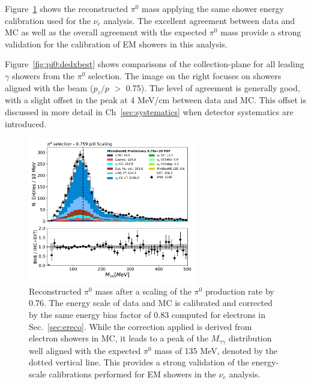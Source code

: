 Figure~\ref{fig:pi0massscaled} shows the reconstructed $\pi^0$ mass applying the same shower energy calibration used for the $\nu_e$ analysis. The excellent agreement between data and MC as well as the overall agreement with the expected $\pi^0$ mass provide a strong validation for the calibration of EM showers in this analysis.

Figure~\ref{fig:pi0:dedxbest} shows comparisons of the collection-plane \dedx for all leading $\gamma$ showers from the $\pi^0$ selection. The image on the right focuses on showers aligned with the beam ($p_z/p$ $>$ 0.75). The level of agreement is generally good, with a slight offset in the \dedx peak at 4 MeV/cm  between data and MC. This offset is discussed in more detail in Ch~\ref{sec:systematics} when detector systematics are introduced. 


\begin{figure}[H]
\begin{center}
\includegraphics[width=0.65\textwidth]{pi0/calorimetry/pi0_mass_Y_corr_run123.pdf}
\caption{\label{fig:pi0massscaled}Reconstructed $\pi^0$ mass after a scaling of the $\pi^0$ production rate by 0.76. The energy scale of data and MC is calibrated and corrected by the same energy bias factor of $0.83$ computed for electrons in Sec.~\ref{sec:ereco}. While the correction applied is derived from electron showers in MC, it leads to a peak of the $M_{\gamma\gamma}$ distribution well aligned with the expected $\pi^0$ mass of 135 MeV, denoted by the dotted vertical line. This provides a strong validation of the energy-scale calibrations performed for EM showers in the $\nu_e$ analysis.}
\end{center}
\end{figure}


